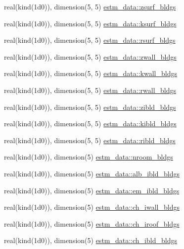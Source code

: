 \begin{DoxyCompactItemize}
real(kind(1d0)), dimension(5, 5) \hyperlink{namespaceestm__data_af0b3ee5c82caffde6cad59e53acf41a2}{estm\+\_\+data\+::zsurf\+\_\+bldgs}
\item 
real(kind(1d0)), dimension(5, 5) \hyperlink{namespaceestm__data_af810783ea0a93838a243c98f96300d07}{estm\+\_\+data\+::ksurf\+\_\+bldgs}
\item 
real(kind(1d0)), dimension(5, 5) \hyperlink{namespaceestm__data_ae021e526e3850da2a5683c8834e829e1}{estm\+\_\+data\+::rsurf\+\_\+bldgs}
\item 
real(kind(1d0)), dimension(5, 5) \hyperlink{namespaceestm__data_a8d30efb7069d9f6ffbca3a762b2ec9ef}{estm\+\_\+data\+::zwall\+\_\+bldgs}
\item 
real(kind(1d0)), dimension(5, 5) \hyperlink{namespaceestm__data_aa4f90c738693b129665f892f3eeb616c}{estm\+\_\+data\+::kwall\+\_\+bldgs}
\item 
real(kind(1d0)), dimension(5, 5) \hyperlink{namespaceestm__data_aba856f5539c396e0cf8f9b6fafef6511}{estm\+\_\+data\+::rwall\+\_\+bldgs}
\item 
real(kind(1d0)), dimension(5, 5) \hyperlink{namespaceestm__data_a67d990e0db5db8d922ab38d6f4c0ec70}{estm\+\_\+data\+::zibld\+\_\+bldgs}
\item 
real(kind(1d0)), dimension(5, 5) \hyperlink{namespaceestm__data_a77620242922d0fa7a2312ae03e464ce8}{estm\+\_\+data\+::kibld\+\_\+bldgs}
\item 
real(kind(1d0)), dimension(5, 5) \hyperlink{namespaceestm__data_a8ecb43f42e5bf6e0baa8109e38e010bd}{estm\+\_\+data\+::ribld\+\_\+bldgs}
\item 
real(kind(1d0)), dimension(5) \hyperlink{namespaceestm__data_aeae0b58494bd32de61b8f33c59ec8a35}{estm\+\_\+data\+::nroom\+\_\+bldgs}
\item 
real(kind(1d0)), dimension(5) \hyperlink{namespaceestm__data_a3663f0ff95c5090d9b5665e4bf5976e8}{estm\+\_\+data\+::alb\+\_\+ibld\+\_\+bldgs}
\item 
real(kind(1d0)), dimension(5) \hyperlink{namespaceestm__data_a0ae656fdc901e094138c7c01e556ab74}{estm\+\_\+data\+::em\+\_\+ibld\+\_\+bldgs}
\item 
real(kind(1d0)), dimension(5) \hyperlink{namespaceestm__data_a719d534316a73fc7012365ced77cfaa7}{estm\+\_\+data\+::ch\+\_\+iwall\+\_\+bldgs}
\item 
real(kind(1d0)), dimension(5) \hyperlink{namespaceestm__data_a7c4af2b5cebe1fd3c88b2c60f8064fd0}{estm\+\_\+data\+::ch\+\_\+iroof\+\_\+bldgs}
\item 
real(kind(1d0)), dimension(5) \hyperlink{namespaceestm__data_af2ac546e3106a586466309672adaf39d}{estm\+\_\+data\+::ch\+\_\+ibld\+\_\+bldgs}

\end{DoxyCompactItemize}
